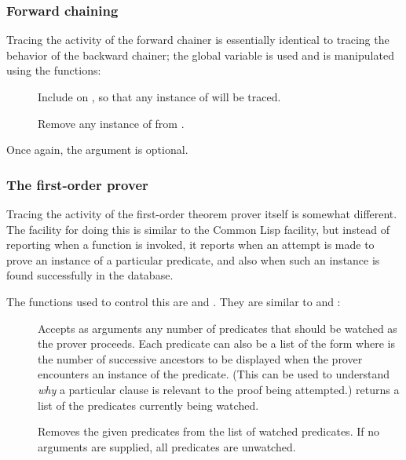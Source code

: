 \subsubsection{Forward chaining}

Tracing the activity of the forward chainer is essentially identical
to tracing the behavior of the backward chainer; the global variable
 is used and is manipulated using the functions:
 \begin{description}
 \item [] Include  on
, so that any instance of  will be
traced.
 \item [] Remove any instance of 
from .
 \end{description}
 Once again, the argument is optional.

\subsubsection{The first-order prover}

Tracing the activity of the first-order theorem prover itself is
somewhat different.  The facility for doing this is similar to the
Common Lisp  facility, but instead of reporting when a
function is invoked, it reports when an attempt is made to prove an
instance of a particular predicate, and also when such an instance is
found successfully in the database.

The functions used to control this are  and
.  They are similar to  and
:

 \begin{description}
 \item [] Accepts as arguments any number of
predicates that should be watched as the prover proceeds.  Each
predicate can also be a list of the form 
where  is the number of successive ancestors to be
displayed when the prover encounters an instance of the predicate.
(This can be used to understand {\em why\/} a particular clause is
relevant to the proof being attempted.)   returns a
list of the predicates currently being {\sc watch}ed.
 \item [] Removes the given predicates from
the list of {\sc watch}ed predicates.  If no arguments are supplied,
all predicates are un{\sc watch}ed.
 \end{description}

